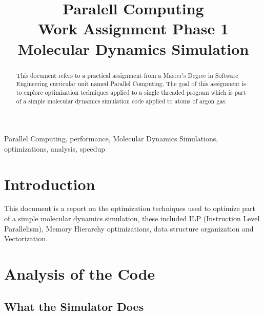 \documentclass[conference]{IEEEtran}
\begin{document}
\title{Paralell Computing \\
       Work Assignment Phase 1 \\
       Molecular Dynamics Simulation}

\author{
\and
{}
}

\maketitle

\begin{abstract}
This document refers to a practical assignment from a Master’s Degree in Software Engineering curricular unit named Parallel Computing. The goal of this assignment is to explore optimization techniques applied to a single threaded program which is part of a simple molecular dynamics simulation code applied to atoms of argon gas.
\end{abstract}

\begin{IEEEkeywords}
Parallel Computing, performance, Molecular Dynamics Simulations, optimizations, analysis, speedup
\end{IEEEkeywords}

\section{Introduction}
This document is a report on the optimization techniques used to optimize part of a simple molecular dynamics simulation, these included ILP (Instruction Level Parallelism), Memory Hierarchy optimizations, data structure organization and Vectorization.

\section{Analysis of the Code}

\subsection{What the Simulator Does}
\end{document}
